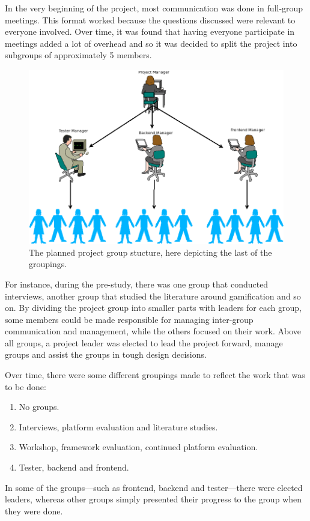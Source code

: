 In the very beginning of the project, most communication was done in full-group meetings. This format worked because the questions discussed were relevant to everyone involved. Over time, it was found that having everyone participate in meetings added a lot of overhead and so it was decided to split the project into subgroups of approximately 5 members.
\begin{figure}[hb]
    \centering
    \includegraphics[width=.8\linewidth]{img/group_structure_1.png}
    \caption{The planned project group stucture, here depicting the last of the groupings.}
\end{figure}

For instance, during the pre-study, there was one group that conducted interviews, another group that studied the literature around gamification and so on. By dividing the project group into smaller parts with leaders for each group, some members could be made responsible for managing inter-group communication and management, while the others focused on their work. Above all groups, a project leader was elected to lead the project forward, manage groups and assist the groups in tough design decisions.

Over time, there were some different groupings made to reflect the work that was to be done:
\begin{enumerate}
    \item No groups.
    \item Interviews, platform evaluation and literature studies.
    \item Workshop, framework evaluation, continued platform evaluation. %
    \item Tester, backend and frontend.
\end{enumerate}
In some of the groups---such as frontend, backend and tester---there were elected leaders, whereas other groups simply presented their progress to the group when they were done.
